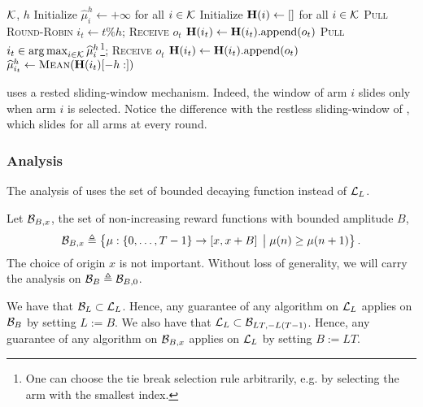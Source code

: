 \begin{minipage}{\textwidth}
\renewcommand*\footnoterule{}
\begin{savenotes}
\begin{algorithm}[H]
\caption{\SWA \citep{levine2017rotting} }
\label{alg:SWA}
\begin{algorithmic}[1]
\Require $\mathcal{K}$, $h$
\State Initialize $\hat{\mu}_{i}^h \leftarrow + \infty$ for all $i \in \mathcal{K}$
\State Initialize $\mathbf{H}(i) \leftarrow []$ for all $i \in \mathcal{K}$
	 	\State \textsc{Pull Round-Robin}  $i_t \gets t \% h $; \textsc{Receive} $o_{t}$
	 	\State $\mathbf{H}(i_t) \leftarrow \mathbf{H}(i_t)\text{.append}(o_{t})$
	\EndFor
		\State \textsc{Pull}  $i_t \in \operatorname*{arg\,max}_{i \in \mathcal{K}} \widehat{\mu}_{i}^h$\footnote{One can choose the tie break selection rule arbitrarily, e.g. by selecting the arm with the smallest index.}; \textsc{Receive} $o_{t}$
		\State $\mathbf{H}(i_t) \leftarrow \mathbf{H}(i_t)\text{.append}(o_{t})$
		\State $\widehat{\mu}_{i_t}^h \leftarrow \textsc{Mean}(\mathbf{H}(i_t)[-h:])$
		\EndIf
	\EndFor
\end{algorithmic}
\end{algorithm}
\end{savenotes}
\end{minipage}
\begin{remark}
\SWA uses a rested sliding-window mechanism. Indeed, the window of arm $i$ slides only when arm $i$ is selected. Notice the difference with the restless sliding-window of \SWUCB \citep{garivier2011upper-confidence-bound}, which slides for all arms at every round.
\end{remark}
%
\subsubsection*{Analysis}

The analysis of \citet{levine2017rotting} uses the set of bounded decaying function instead of $\mathcal{L}_L$. 

\begin{definition}\label{def:rew-bounded} 
Let $\mathcal{B}_{B,x}$, the set of non-increasing reward functions with bounded amplitude $B$,
\[ 
\mathcal{B}_{B,x} \triangleq \left\{ \mu : \left\{0, \dots, T-1 \right\} \rightarrow \left[x , x +B\right] \;\big{|}\; \mu(n) \geq \mu(n+1)  \right\}.
\]
The choice of origin $x$ is not important. Without loss of generality, we will carry the analysis on $\mathcal{B}_{B} \triangleq \mathcal{B}_{B,0}$. 
\end{definition}
\begin{remark}
We have that $\mathcal{B}_L \subset \mathcal{L}_L$. Hence, any guarantee of any algorithm on $\mathcal{L}_L$ applies on $\mathcal{B}_{B}$ by setting $L := B$. We also have that $\mathcal{L}_L \subset \mathcal{B}_{LT, -L\left(T-1\right)}$. Hence, any guarantee of any algorithm on $\mathcal{B}_{B,x}$ applies on $\mathcal{L}_L$ by setting $B := LT$.
\end{remark}

